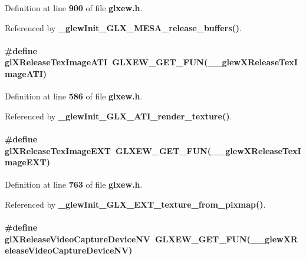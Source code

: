 Definition at line {\bf 900} of file {\bf glxew.\+h}.



Referenced by {\bf \+\_\+glew\+Init\+\_\+\+G\+L\+X\+\_\+\+M\+E\+S\+A\+\_\+release\+\_\+buffers()}.

\paragraph[{gl\+X\+Release\+Tex\+Image\+A\+TI}]{\setlength{\rightskip}{0pt plus 5cm}\#define gl\+X\+Release\+Tex\+Image\+A\+TI~{\bf G\+L\+X\+E\+W\+\_\+\+G\+E\+T\+\_\+\+F\+UN}({\bf \+\_\+\+\_\+glew\+X\+Release\+Tex\+Image\+A\+TI})}\label{glxew_8h_ac0081d8e17faf85307fe99d21fbe2fe1}


Definition at line {\bf 586} of file {\bf glxew.\+h}.



Referenced by {\bf \+\_\+glew\+Init\+\_\+\+G\+L\+X\+\_\+\+A\+T\+I\+\_\+render\+\_\+texture()}.

\paragraph[{gl\+X\+Release\+Tex\+Image\+E\+XT}]{\setlength{\rightskip}{0pt plus 5cm}\#define gl\+X\+Release\+Tex\+Image\+E\+XT~{\bf G\+L\+X\+E\+W\+\_\+\+G\+E\+T\+\_\+\+F\+UN}({\bf \+\_\+\+\_\+glew\+X\+Release\+Tex\+Image\+E\+XT})}\label{glxew_8h_a17fbe507c891708c88eb021cfd718138}


Definition at line {\bf 763} of file {\bf glxew.\+h}.



Referenced by {\bf \+\_\+glew\+Init\+\_\+\+G\+L\+X\+\_\+\+E\+X\+T\+\_\+texture\+\_\+from\+\_\+pixmap()}.

\paragraph[{gl\+X\+Release\+Video\+Capture\+Device\+NV}]{\setlength{\rightskip}{0pt plus 5cm}\#define gl\+X\+Release\+Video\+Capture\+Device\+NV~{\bf G\+L\+X\+E\+W\+\_\+\+G\+E\+T\+\_\+\+F\+UN}({\bf \+\_\+\+\_\+glew\+X\+Release\+Video\+Capture\+Device\+NV})}\label{glxew_8h_ae9f975408c1c70233130f5615303db75}


